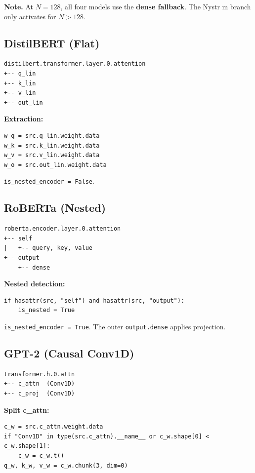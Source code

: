 \textbf{Note.} At $N = 128$, all four models use the \textbf{dense fallback}. The 
Nystr m branch only activates for $N > 128$.

\subsection{DistilBERT (Flat)}

\begin{lstlisting}
distilbert.transformer.layer.0.attention
+-- q_lin
+-- k_lin
+-- v_lin
+-- out_lin
\end{lstlisting}

\textbf{Extraction:}
\begin{lstlisting}
w_q = src.q_lin.weight.data
w_k = src.k_lin.weight.data
w_v = src.v_lin.weight.data
w_o = src.out_lin.weight.data
\end{lstlisting}

\texttt{is\_nested\_encoder = False}.

\subsection{RoBERTa (Nested)}

\begin{lstlisting}
roberta.encoder.layer.0.attention
+-- self
|   +-- query, key, value
+-- output
    +-- dense
\end{lstlisting}

\textbf{Nested detection:}
\begin{lstlisting}
if hasattr(src, "self") and hasattr(src, "output"):
    is_nested = True
\end{lstlisting}

\texttt{is\_nested\_encoder = True}. The outer \texttt{output.dense} applies projection.

\subsection{GPT-2 (Causal Conv1D)}

\begin{lstlisting}
transformer.h.0.attn
+-- c_attn  (Conv1D)
+-- c_proj  (Conv1D)
\end{lstlisting}

\textbf{Split c\_attn:}
\begin{lstlisting}
c_w = src.c_attn.weight.data
if "Conv1D" in type(src.c_attn).__name__ or c_w.shape[0] < c_w.shape[1]:
    c_w = c_w.t()
q_w, k_w, v_w = c_w.chunk(3, dim=0)
\end{lstlisting}

